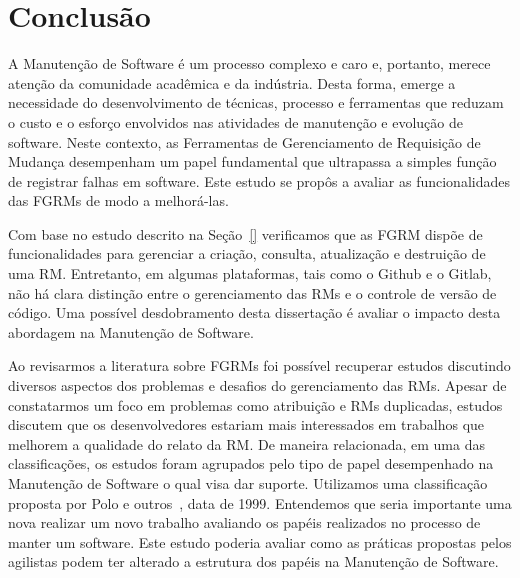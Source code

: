 \chapter{Conclusão}
\label{ch:conclusao_trab_futuros}


A Manutenção de Software é um processo complexo e caro e, portanto, merece
atenção da comunidade acadêmica e da indústria. Desta forma, emerge a
necessidade do desenvolvimento de técnicas, processo e ferramentas que reduzam o
custo e o esforço envolvidos nas atividades de manutenção e evolução de
software. Neste contexto, as Ferramentas de Gerenciamento de Requisição de
Mudança desempenham um papel fundamental que ultrapassa a simples função de
registrar falhas em software. Este estudo se propôs a avaliar as funcionalidades
das FGRMs de modo a melhorá-las.

Com base no estudo descrito na Seção~\ref{} verificamos que as FGRM dispõe de
funcionalidades para gerenciar a criação, consulta, atualização e destruição de
uma RM\@. Entretanto, em algumas plataformas, tais como o Github e o Gitlab, não
há clara distinção entre o gerenciamento das RMs e o controle de versão de
código. Uma possível desdobramento desta dissertação é avaliar o impacto desta
abordagem na Manutenção de Software.

Ao revisarmos a literatura sobre FGRMs foi possível recuperar estudos discutindo
diversos aspectos dos problemas e desafios do gerenciamento das RMs. Apesar de
constatarmos um foco em problemas como atribuição e RMs duplicadas, estudos
discutem que os desenvolvedores estariam mais interessados em trabalhos que
melhorem a qualidade do relato da RM\@. De maneira relacionada, em uma das
classificações, os estudos foram agrupados pelo tipo de papel desempenhado na
Manutenção de Software o qual visa dar suporte. Utilizamos uma classificação
proposta por Polo e outros~\cite{}, data de 1999. Entendemos que seria
importante uma nova realizar um novo trabalho avaliando os papéis realizados no
processo de manter um software. Este estudo poderia avaliar como as práticas
propostas pelos agilistas podem ter alterado a estrutura dos papéis na
Manutenção de Software.

